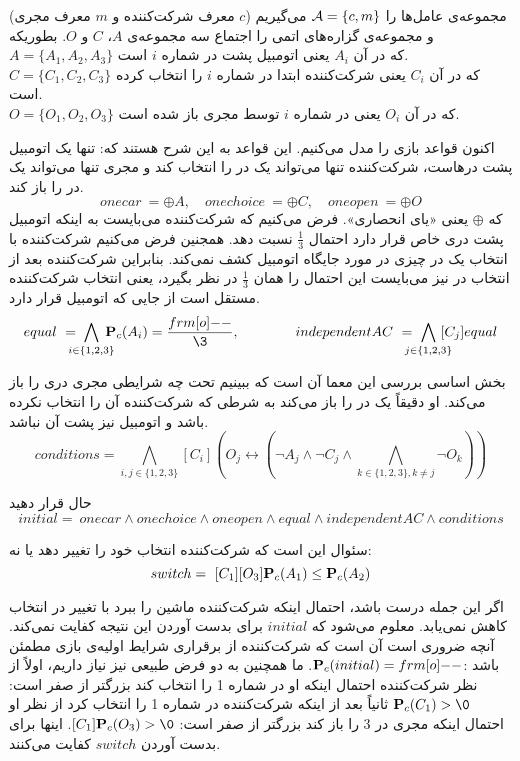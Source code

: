 مجموعه‌ی عامل‌ها را $ \mathcal{A}=\{c,m\} $ می‌گیریم ($ c $ معرف شرکت‌کننده و $ m $ معرف مجری) و مجموعه‌ی گزاره‌های اتمی را اجتماع سه مجموعه‌ی $ A $، $ C $ و $ O $. بطوریکه\\
$ A=\{A_1,A_2,A_3\} $ که در آن $ A_i $ یعنی اتومبیل پشت در شماره $ i $ است.\\
$ C=\{C_1,C_2,C_3\} $ که در آن $ C_i $ یعنی شرکت‌کننده ابتدا در شماره $ i $ را انتخاب کرده است.\\
$ O=\{O_1,O_2,O_3\} $ که در آن $ O_i $ یعنی در شماره $ i $ توسط مجری باز شده است.

اکنون قواعد بازی را مدل می‌کنیم. این قواعد به این شرح هستند که: تنها یک اتومبیل پشت درهاست، شرکت‌کننده تنها می‌تواند یک در را انتخاب کند و مجری تنها می‌تواند یک در را باز کند.
$$onecar\ =\oplus A,\quad onechoice\ =\oplus C,\quad oneopen\ =\oplus O$$
که $ \oplus $ یعنی «یای انحصاری». فرض می‌کنیم که شرکت‌کننده می‌بایست به اینکه اتومبیل پشت دری خاص قرار دارد احتمال $ \frac{1}{3} $ نسبت دهد. همجنین فرض می‌کنیم شرکت‌کننده با انتخاب یک در چیزی در مورد جایگاه اتومبیل کشف نمی‌کند. بنابراین شرکت‌کننده بعد از انتخاب در نیز می‌بایست این احتمال را همان $ \frac{1}{3} $ در نظر بگیرد، یعنی انتخاب شرکت‌کننده مستقل است از جایی که اتومبیل قرار دارد.
$$equal\ =\!\!\!\!\!\bigwedge_{i\in \{1,2,3\}}\!\!\!\!\!\mbP_c(A_i)=\frac{\1}{\3},\qquad\qquad independentAC\ =\!\!\!\!\!\bigwedge_{j\in\{1,2,3\}}\!\!\!\!\![C_j]equal$$

بخش اساسی بررسی این معما آن است که ببینیم تحت چه شرایطی مجری دری را باز می‌کند. او دقیقاً یک در را باز می‌کند به شرطی که شرکت‌کننده آن را انتخاب نکرده باشد و اتومبیل نیز پشت آن نباشد.
$$conditions=\!\!\!\!\!\bigwedge_{i,j\in \{1,2,3\}}[C_i](O_j\leftrightarrow(\neg A_j\wedge\neg C_j\wedge\!\!\!\bigwedge_{k\in\{1,2,3\},k\neq j}\!\!\!\!\!\!\!\!\neg O_k))$$

حال قرار دهید
$$initial=\ onecar\wedge onechoice\wedge oneopen\wedge equal\wedge independentAC\wedge conditions$$

سئوال این است که شرکت‌کننده انتخاب خود را تغییر دهد یا نه:
$$switch=\ [C_1][O_3]\mathbf{P}_c(A_1)\leq \mathbf{P}_c(A_2)$$

اگر این جمله درست باشد، احتمال اینکه شرکت‌کننده ماشین را ببرد با تغییر در انتخاب کاهش نمی‌یابد. معلوم می‌شود که $ initial $ برای بدست آوردن این نتیجه کفایت نمی‌کند. آنچه ضروری است آن است که شرکت‌کننده از برقراری شرایط اولیه‌ی بازی مطمئن باشد :$ \mbP_c(initial)=\1 $. ما همچنین به دو فرض طبیعی نیز نیاز داریم، اولاً از نظر شرکت‌کننده احتمال اینکه او در شماره 1 را انتخاب کند بزرگتر از صفر است: $ \mbP_c(C_1)>\0 $ ثانیاً بعد از اینکه شرکت‌کننده در شماره 1 را انتخاب کرد از نظر او احتمال اینکه مجری در 3 را باز کند بزرگتر از صفر است: $ [C_1]\mbP_c(O_3)>\0 $. اینها برای بدست آوردن $switch$ کفایت می‌کنند.


